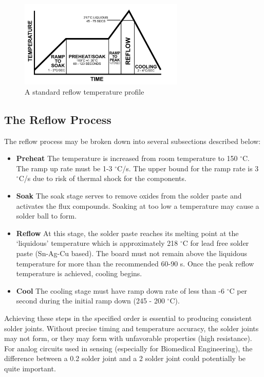\documentclass[10pt]{report}
\begin{document}
\begin{figure}[H]
\centering
   \includegraphics[width=0.7\textwidth]{reflow_Curve.jpg}
    \caption{A standard reflow temperature profile}
\end{figure}

\subsection*{The Reflow Process}
\par The reflow process may be broken down into several subsections described below:

\begin{itemize}
\item \textbf{Preheat} The temperature is increased from room temperature to 150 $^\circ$C. The ramp up rate must be 1-3 $^\circ$C/s. The upper bound for the ramp rate is 3 $^\circ$C/s due to risk of thermal shock for the components.

\item \textbf{Soak} The soak stage serves to remove oxides from the solder paste and activates the flux compounds. Soaking at too low a temperature may cause a solder ball to form.

\item \textbf{Reflow} At this stage, the solder paste reaches its melting point at the ‘liquidous’ temperature which is approximately 218 $^\circ$C for lead free solder paste (Sn-Ag-Cu based). The board must not remain above the liquidous temperature for more than the recommended 60-90 s. Once the peak reflow temperature is achieved, cooling begins.

\item \textbf{Cool} The cooling stage must have  ramp down rate of less than -6 $^\circ$C per second during the initial ramp down (245 - 200 $^\circ$C).

\end{itemize}

\par Achieving these steps in the specified order is essential to producing consistent solder joints. Without precise timing and temperature accuracy, the solder joints may not form, or they may form with unfavorable properties (high resistance). For analog circuits used in sensing (especially for Biomedical Engineering), the difference between a 0.2  solder joint and a 2  solder joint could potentially be quite important. 
\end{document}
